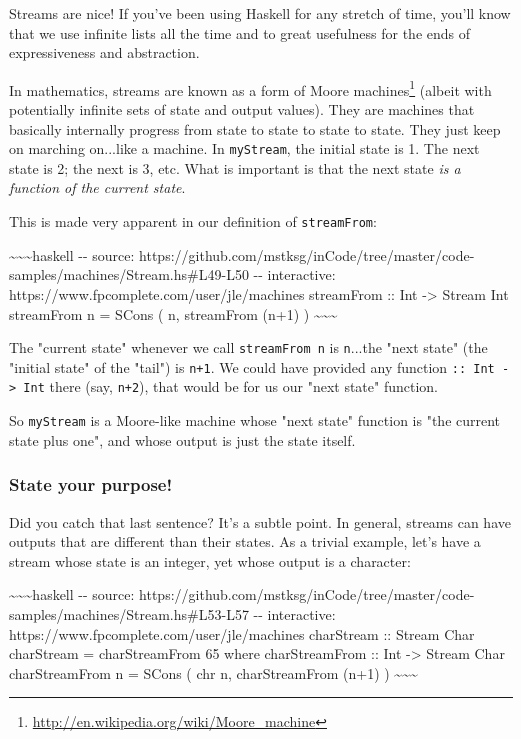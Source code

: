 \documentclass[]{article}
\renewcommand{\href}[2]{#2\footnote{\url{#1}}}
\begin{document}
Streams are nice! If you've been using Haskell for any stretch of time, you'll
know that we use infinite lists all the time and to great usefulness for the
ends of expressiveness and abstraction.

In mathematics, streams are known as a form of
\href{http://en.wikipedia.org/wiki/Moore_machine}{Moore machines} (albeit with
potentially infinite sets of state and output values). They are machines that
basically internally progress from state to state to state to state. They just
keep on marching on...like a machine. In \texttt{myStream}, the initial state is
1. The next state is 2; the next is 3, etc. What is important is that the next
state \emph{is a function of the current state}.

This is made very apparent in our definition of \texttt{streamFrom}:

\textasciitilde{}\textasciitilde{}\textasciitilde{}haskell -\/- source:
https://github.com/mstksg/inCode/tree/master/code-samples/machines/Stream.hs\#L49-L50
-\/- interactive: https://www.fpcomplete.com/user/jle/machines streamFrom :: Int
-\textgreater{} Stream Int streamFrom n = SCons ( n, streamFrom (n+1) )
\textasciitilde{}\textasciitilde{}\textasciitilde{}

The "current state" whenever we call \texttt{streamFrom\ n} is \texttt{n}...the
"next state" (the "initial state" of the "tail") is \texttt{n+1}. We could have
provided any function \texttt{::\ Int\ -\textgreater{}\ Int} there (say,
\texttt{n+2}), that would be for us our "next state" function.

So \texttt{myStream} is a Moore-like machine whose "next state" function is "the
current state plus one", and whose output is just the state itself.

\subsubsection{State your purpose!}

Did you catch that last sentence? It's a subtle point. In general, streams can
have outputs that are different than their states. As a trivial example, let's
have a stream whose state is an integer, yet whose output is a character:

\textasciitilde{}\textasciitilde{}\textasciitilde{}haskell -\/- source:
https://github.com/mstksg/inCode/tree/master/code-samples/machines/Stream.hs\#L53-L57
-\/- interactive: https://www.fpcomplete.com/user/jle/machines charStream ::
Stream Char charStream = charStreamFrom 65 where charStreamFrom :: Int
-\textgreater{} Stream Char charStreamFrom n = SCons ( chr n, charStreamFrom
(n+1) ) \textasciitilde{}\textasciitilde{}\textasciitilde{}
\end{document}
